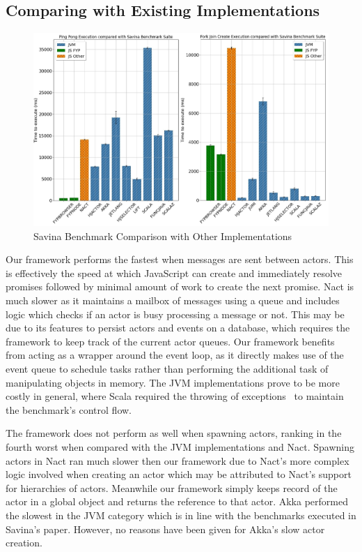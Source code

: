 \documentclass[oneside]{um-fict}
\begin{document}
\subsection{Comparing with Existing Implementations}
\begin{figure}[H]
    \begin{centering}
        \includegraphics[width=\textwidth]{resources/savina.png}
        \caption{Savina Benchmark Comparison with Other Implementations}\label{fig:savina}
    \end{centering}
\end{figure}
Our framework performs the fastest when messages are sent between actors. This is effectively the speed at which JavaScript can create and immediately resolve promises followed by minimal amount of work to create the next promise. Nact is much slower as it maintains a mailbox of messages using a queue and includes logic which checks if an actor is busy processing a message or not. This may be due to its features to persist actors and events on a database, which requires the framework to keep track of the current actor queues. Our framework benefits from acting as a wrapper around the event loop, as it directly makes use of the event queue to schedule tasks rather than performing the additional task of manipulating objects in memory. The JVM implementations prove to be more costly in general, where Scala required the throwing of exceptions~\cite{savina} to maintain the benchmark's control flow.

The framework does not perform as well when spawning actors, ranking in the fourth worst when compared with the JVM implementations and Nact.  Spawning actors in Nact ran much slower then our framework due to Nact's more complex logic involved when creating an actor which may be attributed to Nact's support for hierarchies of actors. Meanwhile our framework simply keeps record of the actor in a global object and returns the reference to that actor. Akka performed the slowest in the JVM category which is in line with the benchmarks executed in Savina's paper.  However, no reasons have been given for Akka's slow actor creation.
\end{document}
